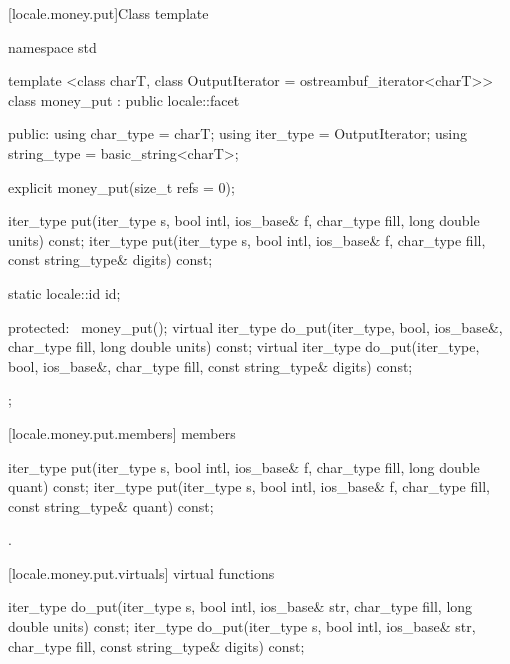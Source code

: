 [locale.money.put]{Class template }

%
\begin{codeblock}
namespace std {
  template <class charT,
    class OutputIterator = ostreambuf_iterator<charT>>
  class money_put : public locale::facet {
  public:
    using char_type   = charT;
    using iter_type   = OutputIterator;
    using string_type = basic_string<charT>;

    explicit money_put(size_t refs = 0);

    iter_type put(iter_type s, bool intl, ios_base& f,
                  char_type fill, long double units) const;
    iter_type put(iter_type s, bool intl, ios_base& f,
                  char_type fill, const string_type& digits) const;

    static locale::id id;

  protected:
    ~money_put();
    virtual iter_type do_put(iter_type, bool, ios_base&, char_type fill,
                             long double units) const;
    virtual iter_type do_put(iter_type, bool, ios_base&, char_type fill,
                             const string_type& digits) const;
  };
}
\end{codeblock}

[locale.money.put.members]{ members}

%
\begin{itemdecl}
iter_type put(iter_type s, bool intl, ios_base& f, char_type fill,
              long double quant) const;
iter_type put(iter_type s, bool intl, ios_base& f, char_type fill,
              const string_type& quant) const;
\end{itemdecl}

\begin{itemdescr}
\pnum
\returns
{}.
\end{itemdescr}

[locale.money.put.virtuals]{ virtual functions}

%
\begin{itemdecl}
iter_type do_put(iter_type s, bool intl, ios_base& str,
                 char_type fill, long double units) const;
iter_type do_put(iter_type s, bool intl, ios_base& str,
                 char_type fill, const string_type& digits) const;
\end{itemdecl}

